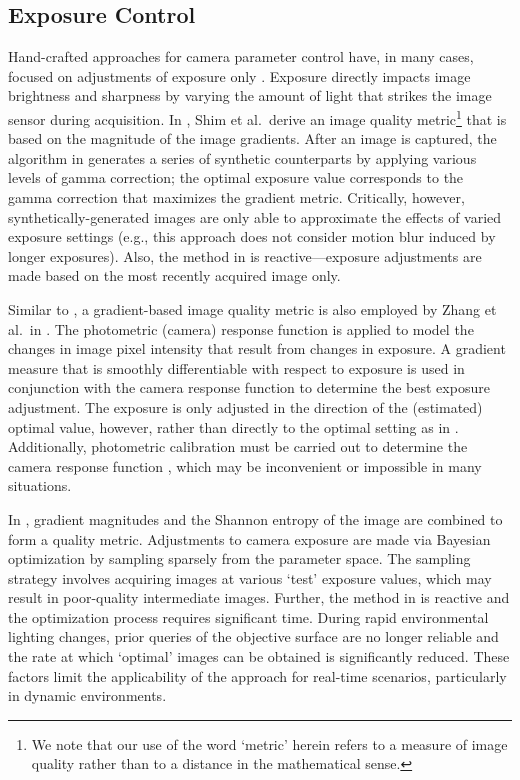 \documentclass[letterpaper, 10pt, journal, twoside]{IEEEtran}
\begin{document}
\subsection{Exposure Control}

Hand-crafted approaches for camera parameter control have, in many cases, focused on adjustments of exposure only \cite{Shim2014, Zhang2017, Kim2018b}. 
Exposure directly impacts image brightness and sharpness by varying the amount of light that strikes the image sensor during acquisition. 
In \cite{Shim2014}, Shim et al.\ derive an image quality metric\footnote{We note that our use of the word `metric' herein refers to a measure of image quality rather than to a distance in the mathematical sense.} that is based on the magnitude of the image gradients. 
After an image is captured, the algorithm in \cite{Shim2014} generates a series of synthetic counterparts by applying various levels of gamma correction; the optimal exposure value corresponds to the gamma correction that maximizes the gradient metric. 
Critically, however, synthetically-generated images are only able to approximate the  effects of varied exposure settings (e.g., this approach does not consider motion blur induced by longer exposures). 
Also, the method in \cite{Shim2014} is reactive---exposure adjustments are made based on the most recently acquired image only.

Similar to \cite{Shim2014}, a gradient-based image quality metric is also employed by Zhang et al.\ in \cite{Zhang2017}. 
The photometric (camera) response function is applied to model the changes in image pixel intensity that result from changes in exposure.
A gradient measure that is smoothly differentiable with respect to exposure is used in conjunction with the camera response function to determine the best exposure adjustment.
The exposure is only adjusted in the direction of the (estimated) optimal value, however, rather than directly to the optimal setting as in \cite{Shim2014}.
Additionally, photometric calibration must be carried out to determine the camera response function \cite{Debevec1997}, which may be inconvenient or impossible in many situations. 

In \cite{Kim2018b}, gradient magnitudes and the Shannon entropy of the image are combined to form a quality metric. 
Adjustments to camera exposure are made via Bayesian optimization by sampling sparsely from the parameter space. 
The sampling strategy involves acquiring images at various `test' exposure values, which may result in poor-quality intermediate images. 
Further, the method in \cite{Kim2018b} is reactive and the optimization process requires significant time. 
During rapid environmental lighting changes, prior queries of the objective surface are no longer reliable and the rate at which `optimal' images can be obtained is significantly reduced.
These factors limit the applicability of the approach for real-time scenarios, particularly in dynamic environments.
\end{document}
